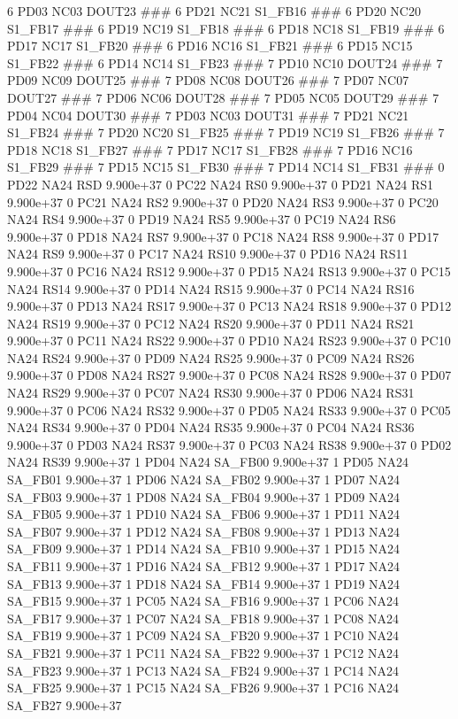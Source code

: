 6 PD03 NC03 DOUT23 ### 
6 PD21 NC21 S1_FB16 ### 
6 PD20 NC20 S1_FB17 ### 
6 PD19 NC19 S1_FB18 ### 
6 PD18 NC18 S1_FB19 ### 
6 PD17 NC17 S1_FB20 ### 
6 PD16 NC16 S1_FB21 ### 
6 PD15 NC15 S1_FB22 ### 
6 PD14 NC14 S1_FB23 ### 
7 PD10 NC10 DOUT24 ### 
7 PD09 NC09 DOUT25 ### 
7 PD08 NC08 DOUT26 ### 
7 PD07 NC07 DOUT27 ### 
7 PD06 NC06 DOUT28 ### 
7 PD05 NC05 DOUT29 ### 
7 PD04 NC04 DOUT30 ### 
7 PD03 NC03 DOUT31 ### 
7 PD21 NC21 S1_FB24 ### 
7 PD20 NC20 S1_FB25 ### 
7 PD19 NC19 S1_FB26 ### 
7 PD18 NC18 S1_FB27 ### 
7 PD17 NC17 S1_FB28 ### 
7 PD16 NC16 S1_FB29 ### 
7 PD15 NC15 S1_FB30 ### 
7 PD14 NC14 S1_FB31 ### 
0 PD22 NA24 RSD 9.900e+37 
0 PC22 NA24 RS0 9.900e+37 
0 PD21 NA24 RS1 9.900e+37 
0 PC21 NA24 RS2 9.900e+37 
0 PD20 NA24 RS3 9.900e+37 
0 PC20 NA24 RS4 9.900e+37 
0 PD19 NA24 RS5 9.900e+37 
0 PC19 NA24 RS6 9.900e+37 
0 PD18 NA24 RS7 9.900e+37 
0 PC18 NA24 RS8 9.900e+37 
0 PD17 NA24 RS9 9.900e+37 
0 PC17 NA24 RS10 9.900e+37 
0 PD16 NA24 RS11 9.900e+37 
0 PC16 NA24 RS12 9.900e+37 
0 PD15 NA24 RS13 9.900e+37 
0 PC15 NA24 RS14 9.900e+37 
0 PD14 NA24 RS15 9.900e+37 
0 PC14 NA24 RS16 9.900e+37 
0 PD13 NA24 RS17 9.900e+37 
0 PC13 NA24 RS18 9.900e+37 
0 PD12 NA24 RS19 9.900e+37 
0 PC12 NA24 RS20 9.900e+37 
0 PD11 NA24 RS21 9.900e+37 
0 PC11 NA24 RS22 9.900e+37 
0 PD10 NA24 RS23 9.900e+37 
0 PC10 NA24 RS24 9.900e+37 
0 PD09 NA24 RS25 9.900e+37 
0 PC09 NA24 RS26 9.900e+37 
0 PD08 NA24 RS27 9.900e+37 
0 PC08 NA24 RS28 9.900e+37 
0 PD07 NA24 RS29 9.900e+37 
0 PC07 NA24 RS30 9.900e+37 
0 PD06 NA24 RS31 9.900e+37 
0 PC06 NA24 RS32 9.900e+37 
0 PD05 NA24 RS33 9.900e+37 
0 PC05 NA24 RS34 9.900e+37 
0 PD04 NA24 RS35 9.900e+37 
0 PC04 NA24 RS36 9.900e+37 
0 PD03 NA24 RS37 9.900e+37 
0 PC03 NA24 RS38 9.900e+37 
0 PD02 NA24 RS39 9.900e+37 
1 PD04 NA24 SA_FB00 9.900e+37 
1 PD05 NA24 SA_FB01 9.900e+37 
1 PD06 NA24 SA_FB02 9.900e+37 
1 PD07 NA24 SA_FB03 9.900e+37 
1 PD08 NA24 SA_FB04 9.900e+37 
1 PD09 NA24 SA_FB05 9.900e+37 
1 PD10 NA24 SA_FB06 9.900e+37 
1 PD11 NA24 SA_FB07 9.900e+37 
1 PD12 NA24 SA_FB08 9.900e+37 
1 PD13 NA24 SA_FB09 9.900e+37 
1 PD14 NA24 SA_FB10 9.900e+37 
1 PD15 NA24 SA_FB11 9.900e+37 
1 PD16 NA24 SA_FB12 9.900e+37 
1 PD17 NA24 SA_FB13 9.900e+37 
1 PD18 NA24 SA_FB14 9.900e+37 
1 PD19 NA24 SA_FB15 9.900e+37 
1 PC05 NA24 SA_FB16 9.900e+37 
1 PC06 NA24 SA_FB17 9.900e+37 
1 PC07 NA24 SA_FB18 9.900e+37 
1 PC08 NA24 SA_FB19 9.900e+37 
1 PC09 NA24 SA_FB20 9.900e+37 
1 PC10 NA24 SA_FB21 9.900e+37 
1 PC11 NA24 SA_FB22 9.900e+37 
1 PC12 NA24 SA_FB23 9.900e+37 
1 PC13 NA24 SA_FB24 9.900e+37 
1 PC14 NA24 SA_FB25 9.900e+37 
1 PC15 NA24 SA_FB26 9.900e+37 
1 PC16 NA24 SA_FB27 9.900e+37 
